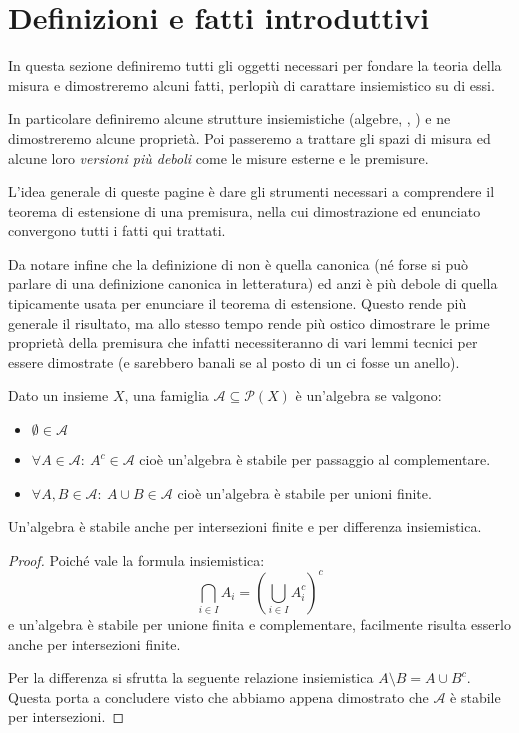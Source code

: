 \section{Definizioni e fatti introduttivi}
In questa sezione definiremo tutti gli oggetti necessari per fondare la teoria della misura e dimostreremo alcuni fatti, perlopiù di carattare insiemistico su di essi.

In particolare definiremo alcune strutture insiemistiche (algebre, \sigalg[e], \semiring[i]) e ne dimostreremo alcune proprietà. Poi passeremo a trattare gli spazi di misura ed alcune loro \emph{versioni più deboli} come le misure esterne e le premisure.

L'idea generale di queste pagine è dare gli strumenti necessari a comprendere il teorema di estensione di una premisura, nella cui dimostrazione ed enunciato convergono tutti i fatti qui trattati. 

Da notare infine che la definizione di \semiring{} non è quella canonica (né forse si può parlare di una definizione canonica in letteratura) ed anzi è più debole di quella tipicamente usata per enunciare il teorema di estensione. Questo rende più generale il risultato, ma allo stesso tempo rende più ostico dimostrare le prime proprietà della premisura che infatti necessiteranno di vari lemmi tecnici per essere dimostrate (e sarebbero banali se al posto di un \semiring{} ci fosse un anello).

\begin{definition}[Algebra]
	Dato un insieme $X$, una famiglia $\mathcal A\subseteq\mathcal P(X)$ è un'algebra se valgono:
	\begin{itemize}
		\item $\emptyset\in\mathcal A$
		\item $\forall A\in\mathcal A:\ A^c\in\mathcal A$ cioè un'algebra è stabile per passaggio al complementare.
		\item $\forall A,B\in\mathcal A:\ A\cup B\in\mathcal A$ cioè un'algebra è stabile per unioni finite.
	\end{itemize}
\end{definition}
\begin{remark}\label{ProprietaAlg}
	Un'algebra è stabile anche per intersezioni finite e per differenza insiemistica.
\end{remark}
\begin{proof}
	Poiché vale la formula insiemistica:
	\begin{equation*}
		\bigcap_{i\in I} A_i = \left( \bigcup_{i\in I} A_i^c \right)^c
	\end{equation*}
	e un'algebra è stabile per unione finita e complementare, facilmente risulta esserlo anche per intersezioni finite.
	
	Per la differenza si sfrutta la seguente relazione insiemistica $A\setminus B=A\cup B^c$. Questa porta a concludere visto che abbiamo appena dimostrato che $\mathcal A$ è stabile per intersezioni.
\end{proof}


